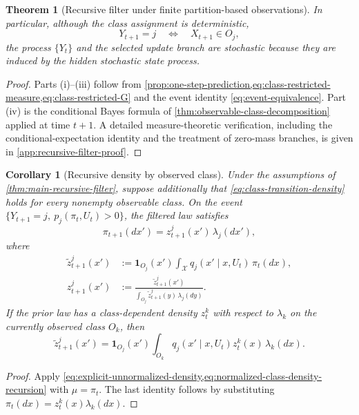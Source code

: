 \documentclass[10pt,twocolumn]{article}
\newtheorem{theorem}{Theorem}
\newtheorem{corollary}{Corollary}
\theoremstyle{remark}
\newcommand{\Xcal}{\mathcal{X}}
\newcommand{\one}{\mathbf{1}}
\begin{document}
\begin{theorem}[Recursive filter under finite partition-based observations]
	In particular, although the class assignment is deterministic,
	\[
	Y_{t+1}=j\quad\Longleftrightarrow\quad X_{t+1}\in O_j,
	\]
	the process \(\{Y_t\}\) and the selected update branch are stochastic because they are induced by the hidden stochastic state process.
\end{theorem}

\begin{proof}
	Parts (i)--(iii) follow from \cref{prop:one-step-prediction,eq:class-restricted-measure,eq:class-restricted-G} and the event identity \cref{eq:event-equivalence}. Part (iv) is the conditional Bayes formula of \cref{thm:observable-class-decomposition} applied at time \(t+1\). A detailed measure-theoretic verification, including the conditional-expectation identity and the treatment of zero-mass branches, is given in \cref{app:recursive-filter-proof}.
\end{proof}

\begin{corollary}[Recursive density by observed class]
	\label{cor:recursive-density}
	Under the assumptions of \cref{thm:main-recursive-filter}, suppose additionally that \cref{eq:class-transition-density} holds for every nonempty observable class. On the event \(\{Y_{t+1}=j,\ p_j(\pi_t,U_t)>0\}\), the filtered law satisfies
	\begin{equation*}
		\pi_{t+1}(dx')
		=z_{t+1}^{j}(x')\,\lambda_j(dx'),
		\label{eq:posterior-density-class}
	\end{equation*}
	where
	\begin{align}
		\widetilde z_{t+1}^{j}(x')
		&:=\one_{O_j}(x')
		\int_{\Xcal}q_j(x'\mid x,U_t)\,\pi_t(dx),
		\label{eq:recursive-unnormalized-density}
		\\
		z_{t+1}^{j}(x')
		&:=\frac{\widetilde z_{t+1}^{j}(x')}
		{\displaystyle\int_{O_j}\widetilde z_{t+1}^{j}(y)\,\lambda_j(dy)}.
		\label{eq:recursive-normalized-density}
	\end{align}
	If the prior law has a class-dependent density \(z_t^k\) with respect to \(\lambda_k\) on the currently observed class \(O_k\), then
	\begin{equation*}
		\widetilde z_{t+1}^{j}(x')
		=
		\one_{O_j}(x')
		\int_{O_k}q_j(x'\mid x,U_t)z_t^k(x)\,\lambda_k(dx).
		\label{eq:density-to-density-recursion}
	\end{equation*}
\end{corollary}

\begin{proof}
	Apply \cref{eq:explicit-unnormalized-density,eq:normalized-class-density-recursion} with \(\mu=\pi_t\). The last identity follows by substituting \(\pi_t(dx)=z_t^k(x)\lambda_k(dx)\).
\end{proof}
\end{document}
